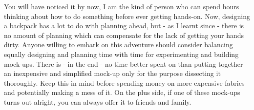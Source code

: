 You will have noticed it by now, I am the kind of person who can spend hours thinking about how to do something before ever getting hands-on. Now, designing a backpack has a lot to do with planning ahead, but - as I learnt since - there is no amount of planning which can compensate for the lack of getting your hands dirty. Anyone willing to embark on this adventure should consider balancing equally designing and planning time with time for experimenting and building mock-ups. There is - in the end - no time better spent on than putting together an inexpensive and simplified mock-up only for the purpose dissecting it thoroughly. Keep this in mind before spending money on more expensive fabrics and potentially making a mess of it. On the plus side, if one of these mock-ups turns out alright, you can always offer it to friends and family.
